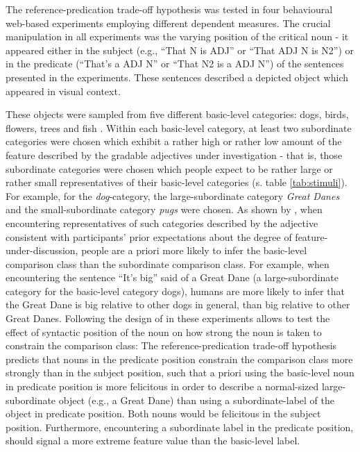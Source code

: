The reference-predication trade-off hypothesis was tested in four behavioural web-based experiments employing different dependent measures. The crucial manipulation in all experiments was the varying position of the critical noun - it appeared either in the subject (e.g., “That N is ADJ” or “That ADJ N is N2”) or in the predicate (“That’s a ADJ N” or “That N2 is a ADJ N”) of the sentences presented in the experiments. These sentences described a depicted object which appeared in visual context. 

These objects were sampled from five different basic-level categories: dogs, birds, flowers, trees and fish \parencite{rosch1976}. Within each basic-level category, at least two subordinate categories were chosen which exhibit a rather high or rather low amount of the feature described by the gradable adjectives under investigation - that is, those subordinate categories were chosen which people expect to be rather large or rather small representatives of their basic-level categories (s. table \ref{tab:stimuli}). For example, for the \textit{dog}-category, the large-subordinate category \textit{Great Danes} and the small-subordinate category \textit{pugs} were chosen. As shown by \textcite{tessler2017warm}, when encountering representatives of such categories described by the adjective consistent with participants’ prior expectations about the degree of feature-under-discussion, people are a priori more likely to infer the basic-level comparison class than the subordinate comparison class. For example, when encountering the sentence “It’s big” said of a Great Dane (a large-subordinate category for the basic-level category dogs), humans are more likely to infer that the Great Dane is big relative to other dogs in general, than big relative to other Great Danes.  
Following the design of \textcite{tessler2017warm} in these experiments allows to test the effect of syntactic position of the noun on how strong the noun is taken to constrain the comparison class: The reference-predication trade-off hypothesis predicts that nouns in the predicate position constrain the comparison class more strongly than in the subject position, such that a priori using the basic-level noun in predicate position is more felicitous in order to describe a normal-sized large-subordinate object (e.g., a Great Dane) than using a subordinate-label of the object in predicate position. Both nouns would be felicitous in the subject position. Furthermore, encountering a subordinate label in the predicate position, should signal a more extreme feature value than the basic-level label.

